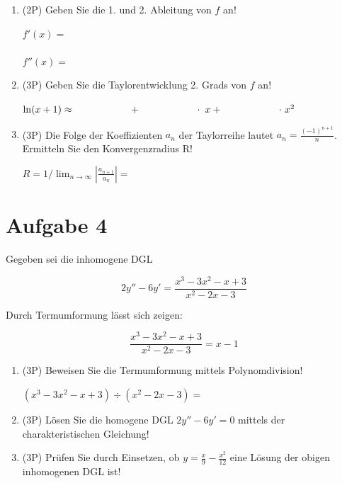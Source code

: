 \documentclass[12pt]{article}
\begin{document}
\begin{enumerate}[label=(\alph*)]

\item (2P) Geben Sie die 1. und 2. Ableitung von $f$ an!

\bigskip

$f'(x) = $ \\
\bigskip \\
$f''(x) = $
\bigskip
\bigskip

\item (3P) Geben Sie die Taylorentwicklung 2. Grads von $f$ an!

\bigskip
\bigskip

$\ln(x+1) \approx \hspace{2cm}   + \hspace{2cm} \cdot \hspace{1mm} x + \hspace{2cm} \cdot \hspace{1mm} x^2$
\bigskip
\bigskip
\bigskip
\bigskip


\item (3P) Die Folge der Koeffizienten $a_n$ der Taylorreihe lautet $a_n=\frac{(-1)^{n+1}}{n}$. Ermitteln Sie den Konvergenzradius R!

\bigskip

$R=1/\lim_{n\to \infty} |\frac{a_{n+1}}{a_n}| = $

\end{enumerate}

\newpage
\section* {Aufgabe 4}

Gegeben sei die inhomogene DGL

$$2y''-6y' = \frac{x^3-3x^2-x+3}{x^2-2x-3}$$

Durch Termumformung lässt sich zeigen:

$$\frac{x^3-3x^2-x+3}{x^2-2x-3} = x-1$$


\begin{enumerate}[label=(\alph*)]

\item (3P) Beweisen Sie die Termumformung mittels Polynomdivision!

$(x^3-3x^2-x+3)\div(x^2-2x-3) =$


\bigskip
\bigskip
\bigskip
\bigskip
\bigskip
\bigskip
\bigskip
\bigskip
\bigskip

\item (3P) Lösen Sie die homogene DGL $2y''-6y'=0$ mittels der charakteristischen Gleichung!

\bigskip
\bigskip
\bigskip
\bigskip
\bigskip
\bigskip
\bigskip
\bigskip
\bigskip

\item (3P) Prüfen Sie durch Einsetzen, ob $y=\frac{x}{9}-\frac{x^2}{12}$ eine Lösung der obigen inhomogenen DGL ist!

\end{enumerate}
\end{document}
